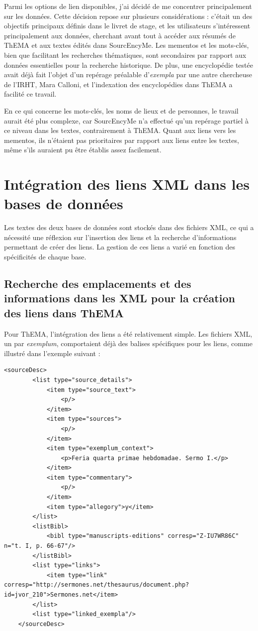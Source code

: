 Parmi les options de lien disponibles, j'ai décidé de me concentrer principalement sur les données. Cette décision repose sur plusieurs considérations : c’était un des objectifs principaux définis dans le livret de stage, et les utilisateurs s'intéressent principalement aux données, cherchant avant tout à accéder aux résumés de ThEMA et aux textes édités dans SourcEncyMe. Les mementos et les mots-clés, bien que facilitant les recherches thématiques, sont secondaires par rapport aux données essentielles pour la recherche historique. De plus, une encyclopédie testée avait déjà fait l’objet d’un repérage préalable d’\textit{exempla} par une autre chercheuse de l’IRHT, Mara Calloni, et l’indexation des encyclopédies dans ThEMA a facilité ce travail. 

En ce qui concerne les mots-clés, les noms de lieux et de personnes, le travail aurait été plus complexe, car SourcEncyMe n'a effectué qu'un repérage partiel à ce niveau dans les textes, contrairement à ThEMA. Quant aux liens vers les mementos, ils n'étaient pas prioritaires par rapport aux liens entre les textes, même s'ils auraient pu être établis assez facilement.


\section{Intégration des liens XML dans les bases de données}
Les textes des deux bases de données sont stockés dans des fichiers XML, ce qui a nécessité une réflexion sur l'insertion des liens et la recherche d'informations permettant de créer des liens. La gestion de ces liens a varié en fonction des spécificités de chaque base.

\subsection{Recherche des emplacements et des informations dans les XML pour la création des liens dans ThEMA}
Pour ThEMA, l'intégration des liens a été relativement simple. Les fichiers XML, un par \textit{exemplum}, comportaient déjà des balises spécifiques pour les liens, comme illustré dans l'exemple suivant : \\

\begin{lstlisting}[breaklines=true]
	<sourceDesc>
		<list type="source_details">
			<item type="source_text">
				<p/>
			</item>
			<item type="sources">
				<p/>
			</item>
			<item type="exemplum_context">
				<p>Feria quarta primae hebdomadae. Sermo I.</p>
			</item>
			<item type="commentary">
				<p/>
			</item>
			<item type="allegory">y</item>
		</list>
		<listBibl>
			<bibl type="manuscripts-editions" corresp="Z-IU7WR86C" n="t. I, p. 66-67"/>
		</listBibl>
		<list type="links">
			<item type="link" corresp="http://sermones.net/thesaurus/document.php?id=jvor_210">Sermones.net</item>
		</list>
		<list type="linked_exempla"/>
	</sourceDesc>
\end{lstlisting} 

